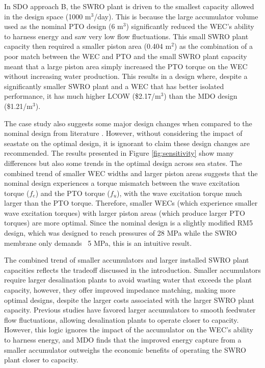 \documentclass[a4paper,12pt]{elsarticle}
\begin{document}
In SDO approach B, the SWRO plant is driven to the smallest capacity allowed in the design space (1000 m$^3$/day). This is because the large accumulator volume used as the nominal PTO design (6 m$^3$) significantly reduced the WEC's ability to harness energy and saw very low flow fluctuations. This small SWRO plant capacity then required a smaller piston area (0.404 m$^2$) as the combination of a poor match between the WEC and PTO and the small SWRO plant capacity meant that a large piston area simply increased the PTO torque on the WEC without increasing water production. This results in a design where, despite a significantly smaller SWRO plant and a WEC that has better isolated performance, it has much higher LCOW (\$2.17/m$^3$) than the MDO design (\$1.21/m$^3$). 

The case study also suggests some major design changes when compared to the nominal design from literature \cite{YJecon2017}. However, without considering the impact of seastate on the optimal design, it is ignorant to claim these design changes are recommended. The results presented in Figure \ref{fig:sensitivity} show many differences but also some trends in the optimal design across sea states. The combined trend of smaller WEC widths and larger piston areas suggests that the nominal design experiences a torque mismatch between the wave excitation torque ($f_e$) and the PTO torque ($f_u$), with the wave excitation torque much larger than the PTO torque. Therefore, smaller WECs (which experience smaller wave excitation torques) with larger piston areas (which produce larger PTO torques) are more optimal. Since the nominal design is a slightly modified RM5 \cite{rm5} design, which  was designed to reach pressures of 28 MPa while the SWRO membrane only demands ~5 MPa, this is an intuitive result. 

The combined trend of smaller accumulators and larger installed SWRO plant capacities reflects the tradeoff discussed in the introduction. Smaller accumulators require larger desalination plants to avoid wasting water that exceeds the plant capacity, however, they offer improved impedance matching, making more optimal designs, despite the larger costs associated with the larger SWRO plant capacity. Previous studies have favored larger accumulators to smooth feedwater flow fluctuations, allowing desalination plants to operate closer to capacity. However, this logic ignores the impact of the accumulator on the WEC's ability to harness energy, and MDO finds that the improved energy capture from a smaller accumulator outweighs the economic benefits of operating the SWRO plant closer to capacity.
\end{document}
